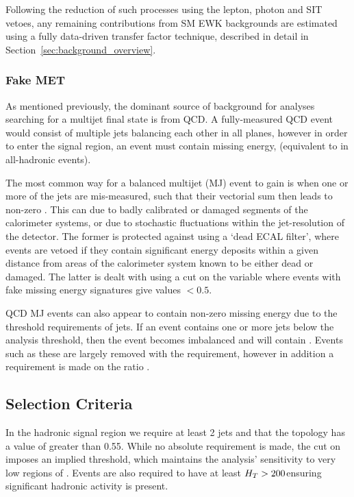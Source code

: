 Following the reduction of such processes using the lepton, photon and SIT vetoes,
any remaining contributions from SM EWK backgrounds are estimated using a 
fully data-driven transfer factor technique, described in detail in
Section~\ref{sec:background_overview}.

\subsubsection{Fake MET}

As mentioned previously, the dominant source of background for analyses 
searching for a multijet final state is from QCD. A fully-measured QCD event 
would consist of multiple jets balancing each other in all planes, however in 
order to enter the signal region, an event must contain missing energy, 
\mht (equivalent to \met in all-hadronic events).

The most common way for a balanced multijet (MJ) event to gain \mht is when one 
or more of the jets are mis-measured, such that their vectorial sum then leads to non-zero
\mht. This can due to badly calibrated or damaged segments of the calorimeter 
systems, or due to stochastic fluctuations within the jet-resolution of the 
detector. The former is protected against using a `dead ECAL filter', where 
events are vetoed if they contain significant energy deposits within a given 
distance from areas of the calorimeter system known to be either dead or 
damaged. The latter is dealt with using a cut on the \alphat variable where 
events with fake missing energy signatures give values $<0.5$.

QCD MJ events can also appear to contain non-zero missing energy 
due to the threshold requirements of jets. If an event contains 
one or more jets below the analysis threshold, then the 
event becomes imbalanced and will contain \mht. Events such as these are largely 
removed with the \alphat requirement, however in addition a requirement is made on the
ratio \mhtmet.

\subsection{Selection Criteria}
\label{sec:selec_crit}
In the hadronic signal region we 
require at least 2 jets and that the topology has a value of \alphat greater than
0.55. While no absolute \met requirement is made, the cut on 
\alphat imposes an implied threshold, which maintains the analysis'
sensitivity to very low regions of \met. Events are also required to have at least
$H_T > 200$\gev ensuring significant hadronic activity is present.

